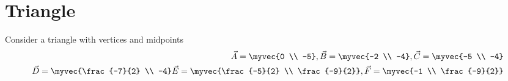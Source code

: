 \documentclass[11pt]{book}
\begin{document}
\frontmatter


\subtitle{Through Algebra}


\titlepage

\tableofcontents

\setcounter{page}{0}

\mainmatter

\chapter{Triangle}

Consider a triangle with vertices and midpoints      \begin{align}                                        \vec{A} = \myvec{0 \\ -5},                           \vec{B} = \myvec{-2 \\ -4},
\vec{C} = \myvec{-5 \\ -4}\\                         \vec{D} = \myvec{\frac{-7}{2} \\ -4}
\vec{E} = \myvec{\frac{-5}{2} \\ \frac{-9}{2}},
\vec{F} = \myvec{-1 \\ \frac{-9}{2}}
\end{align}
\end{document}

